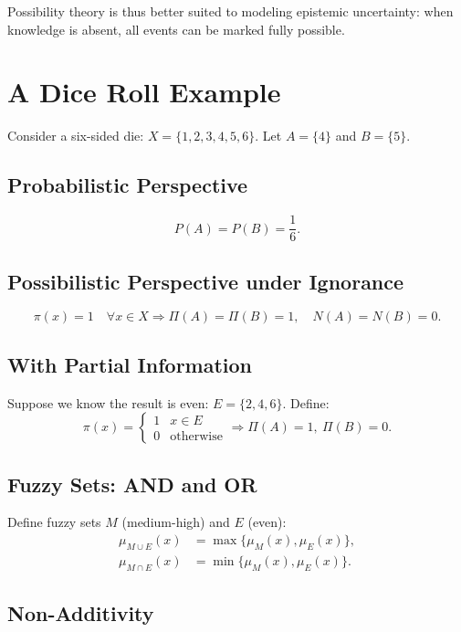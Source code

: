 \documentclass[14pt]{article}
\begin{document}
Possibility theory is thus better suited to modeling epistemic uncertainty: when knowledge is absent, all events can be marked fully possible.

\section{A Dice Roll Example}

Consider a six-sided die: $X = \{1,2,3,4,5,6\}$. Let $A=\{4\}$ and $B=\{5\}$.

\subsection{Probabilistic Perspective}

\[
P(A) = P(B) = \frac{1}{6}.
\]

\subsection{Possibilistic Perspective under Ignorance}

\[
\pi(x) = 1 \quad \forall x \in X \Rightarrow \Pi(A) = \Pi(B) = 1, \quad N(A) = N(B) = 0.
\]

\subsection{With Partial Information}

Suppose we know the result is even: $E=\{2,4,6\}$. Define:
\[
\pi(x) = \begin{cases} 1 & x \in E \\ 0 & \text{otherwise} \end{cases}
\Rightarrow \Pi(A)=1,\ \Pi(B)=0.
\]

\subsection{Fuzzy Sets: AND and OR}

Define fuzzy sets $M$ (medium-high) and $E$ (even):
\begin{align*}
\mu_{M \cup E}(x) &= \max\{\mu_M(x), \mu_E(x)\}, \\
\mu_{M \cap E}(x) &= \min\{\mu_M(x), \mu_E(x)\}.
\end{align*}

\subsection{Non-Additivity}
\end{document}
